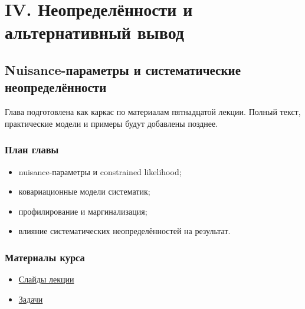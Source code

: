 \documentclass[
  russian,
  12pt,
  a4paper,
  a4paper,
  openany]{scrbook}
\providecommand{\tightlist}{%
  \setlength{\itemsep}{0pt}\setlength{\parskip}{0pt}}
\begin{document}
\part{IV. Неопределённости и альтернативный вывод}

\chapter{Nuisance-параметры и систематические
неопределённости}\label{nuisance-ux43fux430ux440ux430ux43cux435ux442ux440ux44b-ux438-ux441ux438ux441ux442ux435ux43cux430ux442ux438ux447ux435ux441ux43aux438ux435-ux43dux435ux43eux43fux440ux435ux434ux435ux43bux451ux43dux43dux43eux441ux442ux438}

\begin{bookchapteropening}

Глава подготовлена как каркас по материалам пятнадцатой лекции. Полный
текст, практические модели и примеры будут добавлены позднее.

\end{bookchapteropening}

\section{План
главы}\label{ux43fux43bux430ux43d-ux433ux43bux430ux432ux44b-13}

\begin{itemize}
\tightlist
\item
  nuisance-параметры и constrained likelihood;
\item
  ковариационные модели систематик;
\item
  профилирование и маргинализация;
\item
  влияние систематических неопределённостей на результат.
\end{itemize}

\section{Материалы
курса}\label{ux43cux430ux442ux435ux440ux438ux430ux43bux44b-ux43aux443ux440ux441ux430-12}

\begin{itemize}
\tightlist
\item
  \href{https://neutrinohit.github.io/statistical-analysis-course/ru/slides/14_nuisance_parameters_and_systematics.html}{Слайды
  лекции}
\item
  \href{https://neutrinohit.github.io/statistical-analysis-course/ru/slides/exercises/14_nuisance_parameters_and_systematics_exercises.html}{Задачи}
\end{itemize}
\end{document}
